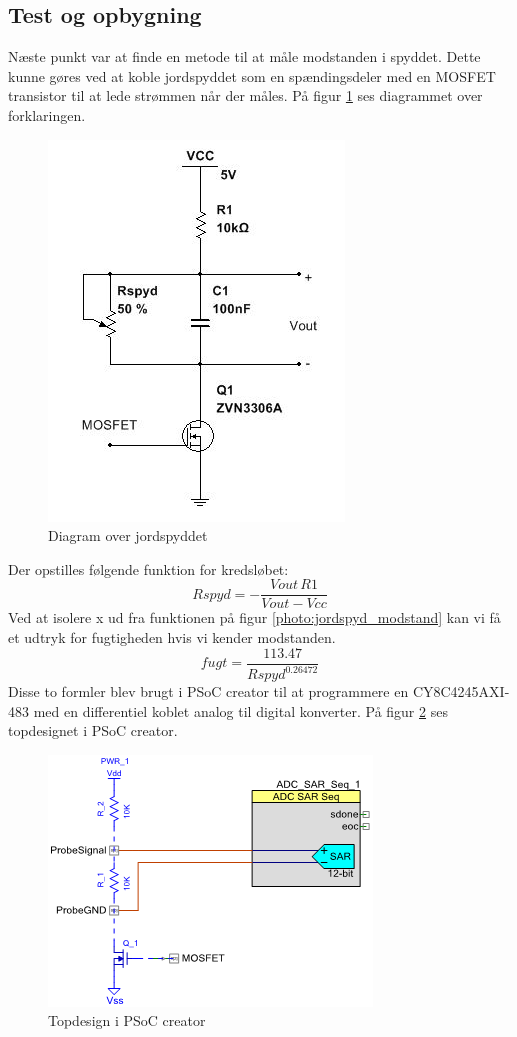 \subsection{Test og opbygning}
Næste punkt var at finde en metode til at måle modstanden i spyddet. Dette kunne gøres ved at koble jordspyddet som en spændingsdeler med en MOSFET transistor til at lede strømmen når der måles. På figur \ref{photo:jordspyd_diagram} ses diagrammet over forklaringen. 
 
\begin{figure}[H]
	\centering 
	\includegraphics[scale=0.8]{HardwareArkitektur/Sensore/Jordfugt_billeder/jordspyd.JPG}
	\caption{Diagram over jordspyddet}
	\label{photo:jordspyd_diagram}
\end{figure} 

Der opstilles følgende funktion for kredsløbet:
$$Rspyd=-{\frac {{Vout}\,{R1}}{{Vout}-{Vcc}}}$$
Ved at isolere x ud fra funktionen på figur \ref{photo:jordspyd_modstand} kan vi få et udtryk for fugtigheden hvis vi kender modstanden. 
$$fugt=\frac{113.47}{Rspyd^{0.26472}}$$
Disse to formler blev brugt i PSoC creator til at programmere en CY8C4245AXI-483 med en differentiel koblet analog til digital konverter. På figur \ref{photo:ADC} ses topdesignet i PSoC creator.    

\begin{figure}[H]
	\centering 
	\includegraphics[scale=0.8]{HardwareArkitektur/Sensore/Jordfugt_billeder/SAR_converter.png}
	\caption{Topdesign i PSoC creator}
	\label{photo:ADC}
\end{figure} 

